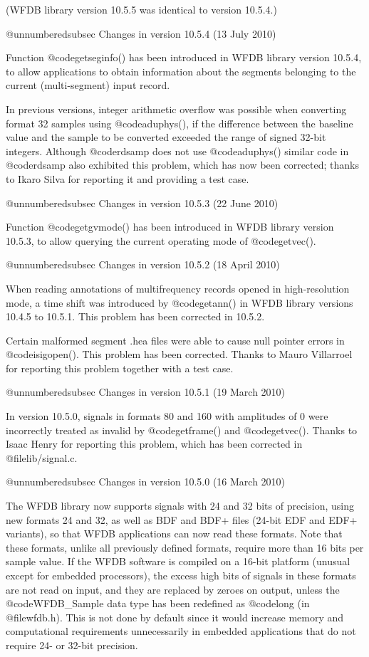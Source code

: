 {{{{{{{{(WFDB library version 10.5.5 was identical to version 10.5.4.)

@unnumberedsubsec Changes in version 10.5.4 (13 July 2010)

Function @code{getseginfo()} has been introduced in WFDB library version
10.5.4, to allow applications to obtain information about the
segments belonging to the current (multi-segment) input record.

In previous versions, integer arithmetic overflow was possible
when converting format 32 samples using @code{aduphys()}, if the difference
between the baseline value and the sample to be converted exceeded
the range of signed 32-bit integers.  Although @code{rdsamp} does not
use @code{aduphys()} similar code in @code{rdsamp} also exhibited this problem,
which has now been corrected;  thanks to Ikaro Silva for
reporting it and providing a test case.

@unnumberedsubsec Changes in version 10.5.3 (22 June 2010)

Function @code{getgvmode()} has been introduced in WFDB library version
10.5.3, to allow querying the current operating mode of @code{getvec()}.

@unnumberedsubsec Changes in version 10.5.2 (18 April 2010)

When reading annotations of multifrequency records opened in
high-resolution mode, a time shift was introduced by @code{getann()} in
WFDB library versions 10.4.5 to 10.5.1.  This problem has been
corrected in 10.5.2.

Certain malformed segment .hea files were able to cause null pointer
errors in @code{isigopen()}.  This problem has been
corrected.  Thanks to Mauro Villarroel for reporting this problem
together with a test case.

@unnumberedsubsec Changes in version 10.5.1 (19 March 2010)

In version 10.5.0, signals in formats 80 and 160 with amplitudes of 0 were
incorrectly treated as invalid by @code{getframe()} and @code{getvec()}.
Thanks to Isaac Henry for reporting this problem, which has been corrected in
@file{lib/signal.c}.

@unnumberedsubsec Changes in version 10.5.0 (16 March 2010)

The WFDB library now supports signals with 24 and 32 bits of precision, using
new formats 24 and 32, as well as BDF and BDF+ files (24-bit EDF and EDF+
variants), so that WFDB applications can now read these formats.  Note that
these formats, unlike all previously defined formats, require more than 16 bits
per sample value.  If the WFDB software is compiled on a 16-bit platform
(unusual except for embedded processors), the excess high bits of signals in
these formats are not read on input, and they are replaced by zeroes on output,
unless the @code{WFDB_Sample} data type has been redefined as @code{long} (in
@file{wfdb.h}).  This is not done by default since it would increase memory and
computational requirements unnecessarily in embedded applications that do not
require 24- or 32-bit precision.

}}}}}}}}
